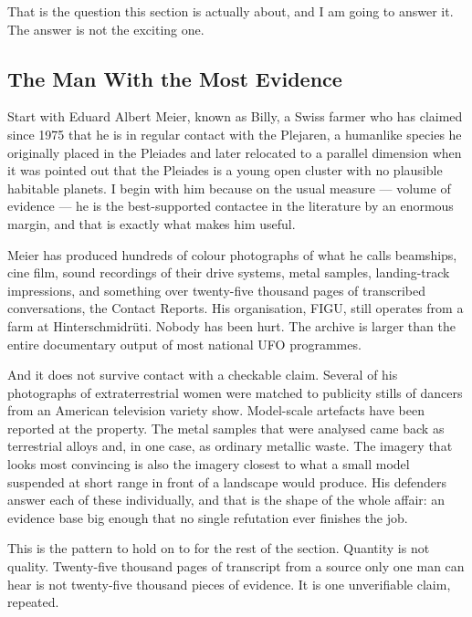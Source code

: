 
That is the question this section is actually about, and I am going to answer it. The answer is not
the exciting one.

\subsection{The Man With the Most Evidence}\label{sec:meier}

Start with Eduard Albert Meier, known as Billy, a Swiss farmer who has claimed since 1975 that he
is in regular contact with the Plejaren, a humanlike species he originally placed in the Pleiades
and later relocated to a parallel dimension when it was pointed out that the Pleiades is a young
open cluster with no plausible habitable planets. I begin with him because on the usual measure
--- volume of evidence --- he is the best-supported contactee in the literature by an enormous
margin, and that is exactly what makes him useful.

Meier has produced hundreds of colour photographs of what he calls beamships, cine film, sound
recordings of their drive systems, metal samples, landing-track impressions, and something over
twenty-five thousand pages of transcribed conversations, the Contact Reports. His organisation,
FIGU, still operates from a farm at Hinterschmidr\"uti. Nobody has been hurt. The archive is
larger than the entire documentary output of most national UFO programmes.

And it does not survive contact with a checkable claim. Several of his photographs of
extraterrestrial women were matched to publicity stills of dancers from an American television
variety show. Model-scale artefacts have been reported at the property. The metal samples that
were analysed came back as terrestrial alloys and, in one case, as ordinary metallic waste. The
imagery that looks most convincing is also the imagery closest to what a small model suspended
at short range in front of a landscape would produce. His defenders answer each of these
individually, and that is the shape of the whole affair: an evidence base big enough that no
single refutation ever finishes the job.

This is the pattern to hold on to for the rest of the section. Quantity is not quality. Twenty-five
thousand pages of transcript from a source only one man can hear is not twenty-five thousand pieces
of evidence. It is one unverifiable claim, repeated.

